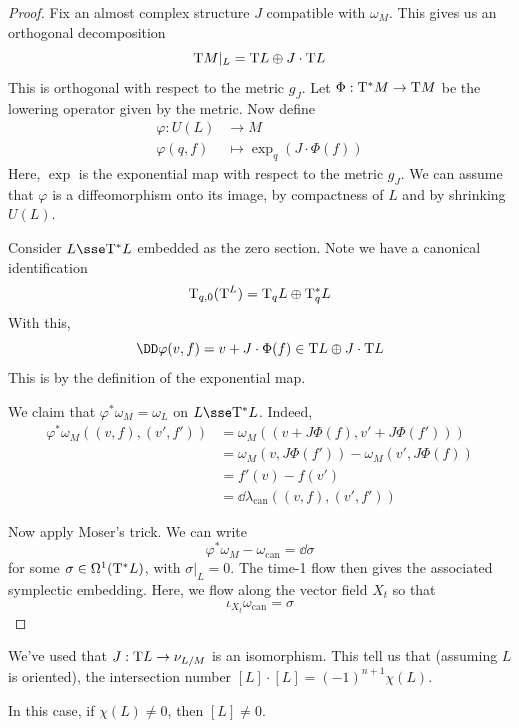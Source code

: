 \documentclass{article}
\begin{document}
\lec

\begin{proof}
    Fix an almost complex structure \(J\) compatible with \(\omega_M\). This gives us an orthogonal decomposition
    \[\mathrm{T} M\vert_L = \mathrm{T} L \oplus J \cdot \mathrm{T} L\]
    This is orthogonal with respect to the metric \(g_J\). Let \(\Phi : \mathrm{T}^* M \to \mathrm{T} M\) be the lowering operator given by the metric. Now define
    \begin{align*}
        \varphi : U(L) &\to M \\
        \varphi(q, f) &\mapsto \exp_q(J \cdot \Phi(f))
    \end{align*}
    Here, \(\exp\) is the exponential map with respect to the metric \(g_J\). We can assume that \(\varphi\) is a diffeomorphism onto its image, by compactness of \(L\) and by shrinking \(U(L)\).

    Consider \(L \sse \T^*L\) embedded as the zero section. Note we have a canonical identification
    \[\mathrm{T}_{q, 0}(\mathrm{T}^ L) = \mathrm{T}_qL \oplus \mathrm{T}_q^* L\]
    With this,
    \[\DD \varphi(v, f) = v + J\cdot \Phi(f) \in \T L \oplus J \cdot \T L\]
    This is by the definition of the exponential map.

    We claim that \(\varphi^*\omega_M = \omega_L\) on \(L \sse \T^* L\). Indeed,
    \begin{align*}
        \varphi^*\omega_M((v, f), (v', f')) &= \omega_M((v + J\Phi(f), v' + J\Phi(f'))) \\
        &= \omega_M(v, J\Phi(f')) - \omega_M(v', J\Phi(f)) \\
        &= f'(v) - f(v') \\
        &= \dd\lambda_{\text{can}}((v, f), (v', f'))
    \end{align*}
    
    Now apply Moser's trick. We can write
    \[\varphi^*\omega_M - \omega_{\text{can}} = \dd\sigma\]
    for some \(\sigma \in \Omega^1(\mathrm{T}^* L)\), with \(\sigma\vert_L = 0\). The time-1 flow then gives the associated symplectic embedding. Here, we flow along the vector field \(X_t\) so that
    \[\iota_{X_t} \omega_{\text{can}} = \sigma\]
\end{proof}

\begin{remark}
    We've used that \(J : \mathrm{T} L \to \nu_{L/M}\) is an isomorphism. This tell us that (assuming \(L\) is oriented), the intersection number \([L]\cdot [L] = (-1)^{n+1}\chi(L)\).

    In this case, if \(\chi(L) \ne 0\), then \([L] \ne 0\).
\end{remark}
\end{document}
